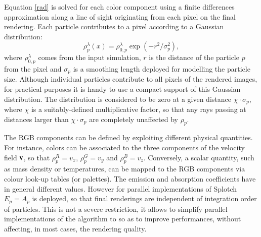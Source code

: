 \documentclass[1p]{elsarticle}
\begin{document}
Equation \eqref{rad} is solved for each color component using a finite differences 
approximation along a line of sight originating from each pixel on the final rendering. Each 
particle contributes to a pixel according to a Gaussian distribution:
\begin{equation}\label{smooth}
\rho_p^{\lambda}(x)=\rho_{0,p}^{\lambda}\exp(-r^2/\sigma_p^2),
\end{equation}
where $\rho_{0,p}^{\lambda}$ comes from the input simulation, 
$r$ is the distance of the particle $p$ from the pixel and 
$\sigma_p$ is a smoothing length deployed for modelling the particle size. 
Although individual particles contribute to all pixels of the rendered images, 
for practical purposes it is handy to use a compact support of this
Gaussian distribution. The distribution is considered to be zero at a given
distance $\chi\cdot\sigma_p$, where $\chi$ is a suitably-defined multiplicative factor, so that any rays passing at distances larger than $\chi\cdot\sigma_p$ are completely unaffected by $\rho_p$.

The RGB components can be defined by exploiting different physical quantities. For instance, colors 
can be associated to the three components of the velocity field $\bf v$, so that 
$\rho_p^{R}=v_x$, $\rho_p^{G}=v_y$ and $\rho_p^{B}=v_z$. Conversely, a scalar quantity, such as mass density or temperatures, can be mapped
to the RGB components via colour look-up tables (or palettes). The emission and absorption coefficients have in general different values. However for parallel implementations of Splotch $E_p=A_p$ is deployed, so that final renderings are independent of integration order of particles. This is not a severe restriction, it allows to simplify parallel implementations of the algorithm to so as to improve performances, without affecting, in most cases, the rendering quality.%

\end{document}
